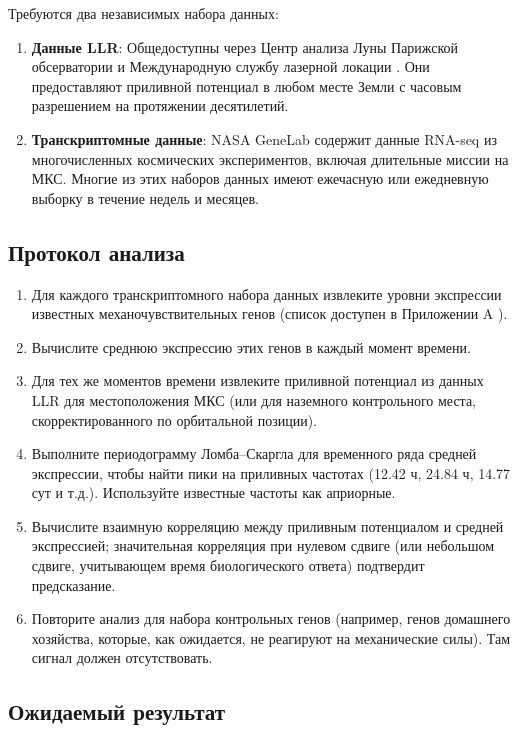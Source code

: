 \documentclass[12pt,a4paper]{article}
\theoremstyle{remark}
\begin{document}
	Требуются два независимых набора данных:
	
	\begin{enumerate}
		\item \textbf{Данные LLR}: Общедоступны через Центр анализа Луны Парижской обсерватории \cite{LLR-POLAC} и Международную службу лазерной локации \cite{ILRS}. Они предоставляют приливной потенциал в любом месте Земли с часовым разрешением на протяжении десятилетий.
		\item \textbf{Транскриптомные данные}: NASA GeneLab \cite{NASA-GeneLab} содержит данные RNA-seq из многочисленных космических экспериментов, включая длительные миссии на МКС. Многие из этих наборов данных имеют ежечасную или ежедневную выборку в течение недель и месяцев.
	\end{enumerate}
	
	\subsection{Протокол анализа}
	
	\begin{enumerate}
		\item Для каждого транскриптомного набора данных извлеките уровни экспрессии известных механочувствительных генов (список доступен в Приложении A \cite{NASA-GeneLab}).
		\item Вычислите среднюю экспрессию этих генов в каждый момент времени.
		\item Для тех же моментов времени извлеките приливной потенциал из данных LLR для местоположения МКС (или для наземного контрольного места, скорректированного по орбитальной позиции).
		\item Выполните периодограмму Ломба–Скаргла для временного ряда средней экспрессии, чтобы найти пики на приливных частотах (12.42 ч, 24.84 ч, 14.77 сут и т.д.). Используйте известные частоты как априорные.
		\item Вычислите взаимную корреляцию между приливным потенциалом и средней экспрессией; значительная корреляция при нулевом сдвиге (или небольшом сдвиге, учитывающем время биологического ответа) подтвердит предсказание.
		\item Повторите анализ для набора контрольных генов (например, генов домашнего хозяйства, которые, как ожидается, не реагируют на механические силы). Там сигнал должен отсутствовать.
	\end{enumerate}
	
	\subsection{Ожидаемый результат}
	
\end{document}
